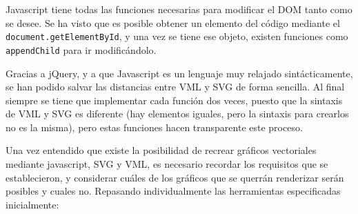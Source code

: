 Javascript tiene todas las funciones necesarias para modificar el DOM tanto como se desee. Se ha visto que es posible obtener un elemento del código mediante el \texttt{document.getElementById}, y una vez se tiene ese objeto, existen funciones como \texttt{appendChild} para ir modificándolo.

Gracias a jQuery, y a que Javascript es un lenguaje muy relajado sintácticamente, se han podido salvar las distancias entre VML y SVG de forma sencilla. Al final siempre se tiene que implementar cada función dos veces, puesto que la sintaxis de VML y SVG es diferente (hay elementos iguales, pero la sintaxis para crearlos no es la misma), pero estas funciones hacen transparente este proceso. 

Una vez entendido que existe la posibilidad de recrear gráficos vectoriales mediante javascript, SVG y VML, es necesario recordar los requisitos que se establecieron, y considerar cuáles de los gráficos que se querrán renderizar serán posibles y cuales no. Repasando individualmente las herramientas especificadas inicialmente: 

